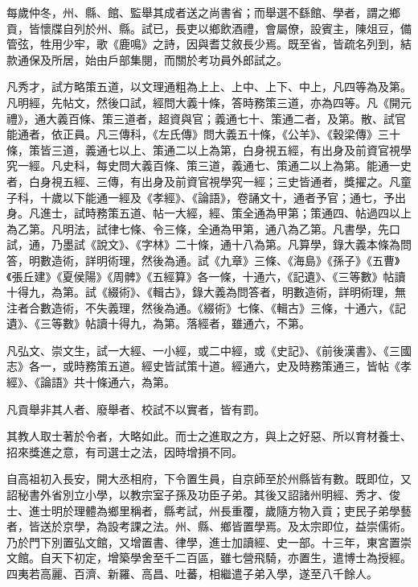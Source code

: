 \begin{pinyinscope}
 每歲仲冬，州、縣、館、監舉其成者送之尚書省；而舉選不繇館、學者，謂之鄉貢，皆懷牒自列於州、縣。試已，長吏以鄉飲酒禮，會屬僚，設賓主，陳俎豆，備管弦，牲用少牢，歌《鹿鳴》之詩，因與耆艾敘長少焉。既至省，皆疏名列到，結款通保及所居，始由戶部集閱，而關於考功員外郎試之。



 凡秀才，試方略策五道，以文理通粗為上上、上中、上下、中上，凡四等為及第。凡明經，先帖文，然後口試，經問大義十條，答時務策三道，亦為四等。凡《開元禮》，通大義百條、策三道者，超資與官；義通七十、策通二者，及第。散、試官能通者，依正員。凡三傳科，《左氏傳》問大義五十條，《公羊》、《穀梁傳》三十條，策皆三道，義通七以上、策通二以上為第，白身視五經，有出身及前資官視學究一經。凡史科，每史問大義百條、策三道，義通七、策通二以上為第。能通一史者，白身視五經、三傳，有出身及前資官視學究一經；三史皆通者，獎擢之。凡童子科，十歲以下能通一經及《孝經》、《論語》，卷誦文十，通者予官；通七，予出身。凡進士，試時務策五道、帖一大經，經、策全通為甲第；策通四、帖過四以上為乙第。凡明法，試律七條、令三條，全通為甲第，通八為乙第。凡書學，先口試，通，乃墨試《說文》、《字林》二十條，通十八為第。凡算學，錄大義本條為問答，明數造術，詳明術理，然後為通。試《九章》三條、《海島》《孫子》《五曹》《張丘建》《夏侯陽》《周髀》《五經算》各一條，十通六，《記遺》、《三等數》帖讀十得九，為第。試《綴術》、《輯古》，錄大義為問答者，明數造術，詳明術理，無注者合數造術，不失義理，然後為通。《綴術》七條、《輯古》三條，十通六，《記遺》、《三等數》帖讀十得九，為第。落經者，雖通六，不第。



 凡弘文、崇文生，試一大經、一小經，或二中經，或《史記》、《前後漢書》、《三國志》各一，或時務策五道。經史皆試策十道。經通六，史及時務策通三，皆帖《孝經》、《論語》共十條通六，為第。



 凡貢舉非其人者、廢舉者、校試不以實者，皆有罰。



 其教人取士著於令者，大略如此。而士之進取之方，與上之好惡、所以育材養士、招來獎進之意，有司選士之法，因時增損不同。



 自高祖初入長安，開大丞相府，下令置生員，自京師至於州縣皆有數。既即位，又詔秘書外省別立小學，以教宗室子孫及功臣子弟。其後又詔諸州明經、秀才、俊士、進士明於理體為鄉里稱者，縣考試，州長重覆，歲隨方物入貢；吏民子弟學藝者，皆送於京學，為設考課之法。州、縣、鄉皆置學焉。及太宗即位，益崇儒術。乃於門下別置弘文館，又增置書、律學，進士加讀經、史一部。十三年，東宮置崇文館。自天下初定，增築學舍至千二百區，雖七營飛騎，亦置生，遣博士為授經。四夷若高麗、百濟、新羅、高昌、吐蕃，相繼遣子弟入學，遂至八千餘人。




\end{pinyinscope}
